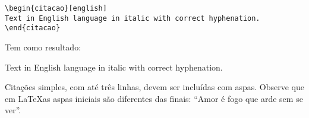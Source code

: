 \begin{verbatim}
\begin{citacao}[english]
Text in English language in italic with correct hyphenation.
\end{citacao}
\end{verbatim}

Tem como resultado:

\begin{citacao}[english]
Text in English language in italic with correct hyphenation.
\end{citacao}

Citações simples, com até três linhas, devem ser
incluídas com aspas. Observe que em \LaTeX as aspas iniciais são diferentes das
finais: ``Amor é fogo que arde sem se ver''.

